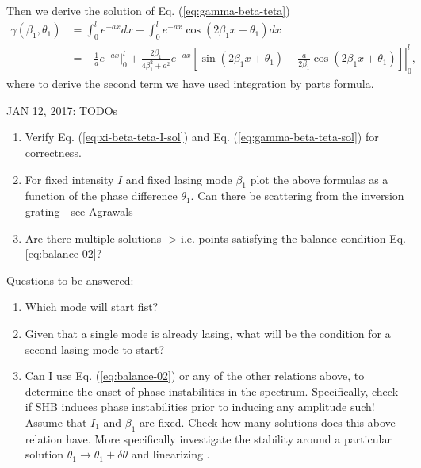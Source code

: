 \documentclass[preprint,secnumarabic,amssymb, nobibnotes, aip, prd]{revtex4-1}
\begin{document}
Then we derive the solution of Eq. (\ref{eq:gamma-beta-teta})
\begin{align}
\label{eq:gamma-beta-teta-sol}
\gamma(\beta_1,\theta_1) &= \int_{0}^{l}e^{-ax}dx + \int_{0}^{l}e^{-ax}\cos(2\beta_1 x+\theta_1)dx  \nonumber \\
&= -\frac{1}{a}\left. e^{-ax}\right |_0^l +  \frac{2\beta_1}{4\beta_1^2+a^2} \left.e^{-ax} \left[\sin(2\beta_1x+\theta_1)-\frac{a}{2\beta_1}\cos(2\beta_1x+\theta_1) \right] \right |_0^l,
\end{align}
where to derive the second term we have used integration by parts formula. 

JAN 12, 2017: TODOs
\begin{enumerate}
	\item Verify Eq. (\ref{eq:xi-beta-teta-I-sol}) and Eq. (\ref{eq:gamma-beta-teta-sol}) for correctness. 
	\item For fixed intensity $I$ and fixed lasing mode $\beta_1$ plot the above formulas as a function of the phase difference $\theta_1$. Can there be scattering from the inversion grating - see Agrawals
	\item Are there multiple solutions -> i.e. points satisfying the balance condition Eq. \ref{eq:balance-02}?
\end{enumerate}

 
Questions to be answered:
\begin{enumerate}
	\item Which mode will start fist?
	\item Given that a single mode is already lasing, what will be the condition for a second lasing mode to start?
	\item Can I use Eq. (\ref{eq:balance-02}) or any of the other relations above, to determine the onset of phase instabilities in the spectrum. Specifically, check if SHB induces phase instabilities prior to inducing any amplitude such! Assume that $I_1$ and $\beta_1$ are fixed. Check how many solutions does this above relation have. More specifically investigate the stability around a particular solution $\theta_1 \rightarrow \theta_1+\delta\theta$ and linearizing .
\end{enumerate}


\end{document}
